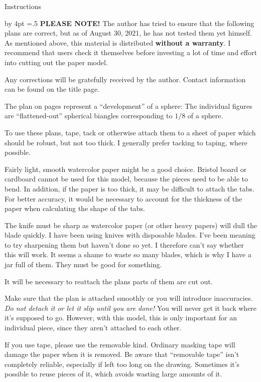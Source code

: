 \medium
{}
\centerline{{\largebx Instructions}}
\advance\baselineskip by 4pt
\parskip=.5\baselineskip
{\bf PLEASE NOTE!}  The author has tried to ensure that the following
plans are correct, but as of August 30, 2021, he has not tested them
yet himself.  As mentioned above, this material is distributed {\bf without
a warranty}.  I recommend that users check it themselves before
investing a lot of time and effort into cutting out the paper model.

Any corrections will be gratefully received by the author.  Contact
information can be found on the title page.

The plan on pages represent a ``development'' of a sphere:  The individual figures
are ``flattened-out'' spherical biangles corresponding to $1/8$ of a sphere.

To use these plans, tape, tack or otherwise attach them to a sheet of
paper which should be robust, but not too thick.  I generally prefer tacking
to taping, where possible.

Fairly light, smooth
watercolor paper might be a good choice.  Bristol board or cardboard cannot be
used for this model, because the pieces need to be able to bend.  In addition,
if the paper is too thick, it may be difficult to attach the tabs.  For better
accuracy, it would be necessary to account for the thickness of the paper when
calculating the shape of the tabs.

The knife must be sharp as watercolor paper (or other heavy papers) will 
dull the blade quickly.
I have been using knives with disposable blades.  I've been meaning to
try sharpening them but haven't done so yet.  I therefore can't say
whether this will work.  It seems a shame to waste so many blades,
which is why I have a jar full of them.  They must be good for
something. 

It will be necessary to reattach the plans parts of them are cut out.

Make sure that the plan is attached smoothly or you will introduce
inaccuracies.  {\it Do not detach it or let it slip until you are
done!\/}  You will never get it back where it's supposed to go. 
However, with this model, this is only important for an individual piece,
since they aren't attached to each other.

If you use tape, please use the removable kind.  Ordinary masking tape will
damage the paper when it is removed.  Be aware that ``removable tape'' isn't
completely reliable, especially if left too long on the drawing.  Sometimes
it's possible to reuse pieces of it, which avoids wasting large amounts of
it. 
\vfil\eject
\endgroup


